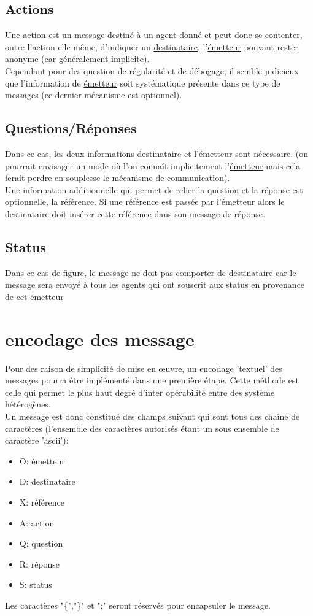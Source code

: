 \documentclass[french]{article}
\begin{document}
\subsection{Actions}
Une action est un message destiné à un agent donné et peut donc se contenter, outre l'action elle même, d'indiquer un \underline{destinataire}, l’\underline{émetteur} pouvant rester anonyme (car généralement implicite).\\
Cependant pour des question de régularité et de débogage, il semble judicieux que l'information de \underline{émetteur} soit systématique présente dans ce type de messages (ce dernier mécanisme est optionnel).
\subsection{Questions/Réponses}
Dans ce cas, les deux informations \underline{destinataire} et l’\underline{émetteur} sont nécessaire. (on pourrait envisager un mode où l'on connaît implicitement l’\underline{émetteur} mais cela ferait perdre en souplesse le mécanisme de communication).\\
Une information additionnelle qui permet de relier la question et la réponse est optionnelle, la \underline{référence}. Si une référence est passée par l'\underline{émetteur} alors le \underline{destinataire} doit insérer cette \underline{référence} dans son message de réponse.
\subsection{Status}
Dans ce cas de figure, le message ne doit pas comporter de \underline{destinataire} car le message sera envoyé à tous les agents qui ont souscrit aux status en provenance de cet \underline{émetteur} 
\section{encodage des message}
Pour des raison de simplicité de mise en œuvre, un encodage 'textuel' des messages pourra être implémenté dans une première étape. Cette méthode est celle qui permet le plus haut degré d'inter opérabilité entre des système hétérogènes.\\
Un message est donc constitué des champs suivant qui sont tous des chaîne de caractères (l'ensemble des caractères autorisés étant un sous ensemble de caractère 'ascii'):
\begin{itemize}
	\item O: émetteur  
	\item D: destinataire
	\item X: référence
	\item A: action
	\item Q: question
	\item R: réponse
	\item S: status
\end{itemize}
Les caractères "\{","\}" et ";" seront réservés pour encapsuler le message.
\end{document}
